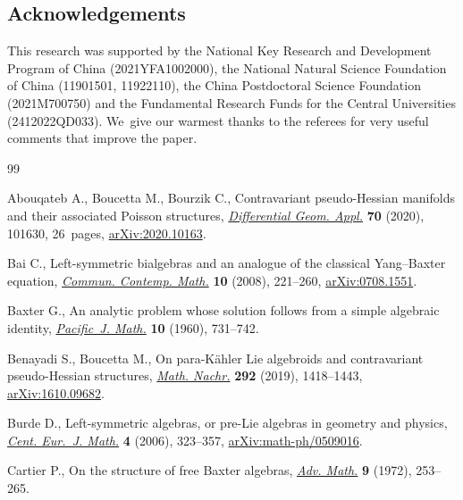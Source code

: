 \documentclass[10pt,a4paper]{amsart}
\numberwithin{equation}{section}
\begin{document}
\subsection*{Acknowledgements}

This research was supported by the National Key Research and Development Program of China (2021YFA1002000), the National Natural Science Foundation of China (11901501, 11922110), the China Postdoctoral Science Foundation (2021M700750) and the Fundamental Research Funds for the Central Universities (2412022QD033). We~give our warmest thanks to the referees for very useful comments that improve the paper.\vspace{-1ex}


\begin{thebibliography}{99}
\footnotesize\itemsep=-0.75pt

Abouqateb A., Boucetta M., Bourzik C., Contravariant pseudo-{H}essian manifolds
 and their associated {P}oisson structures, \href{https://doi.org/10.1016/j.difgeo.2020.101630}{\textit{Differential Geom. Appl.}}
 \textbf{70} (2020), 101630, 26~pages, \href{https://arxiv.org/abs/2020.10163}{arXiv:2020.10163}.

Bai C., Left-symmetric bialgebras and an analogue of the classical
 {Y}ang--{B}axter equation, \href{https://doi.org/10.1142/S0219199708002752}{\textit{Commun. Contemp. Math.}} \textbf{10}
 (2008), 221--260, \href{https://arxiv.org/abs/0708.1551}{arXiv:0708.1551}.

Baxter G., An analytic problem whose solution follows from a simple algebraic
 identity, \href{https://doi.org/10.2140/pjm.1960.10.731}{\textit{Pacific~J. Math.}} \textbf{10} (1960), 731--742.

Benayadi S., Boucetta M., On para-{K}\"{a}hler {L}ie algebroids and
 contravariant pseudo-{H}essian structures, \href{https://doi.org/10.1002/mana.201700137}{\textit{Math. Nachr.}} \textbf{292}
 (2019), 1418--1443, \href{https://arxiv.org/abs/1610.09682}{arXiv:1610.09682}.

Burde D., Left-symmetric algebras, or pre-{L}ie algebras in geometry and
 physics, \href{https://doi.org/10.2478/s11533-006-0014-9}{\textit{Cent. Eur.~J. Math.}} \textbf{4} (2006), 323--357,
 \href{https://arxiv.org/abs/math-ph/0509016}{arXiv:math-ph/0509016}.

Cartier P., On the structure of free {B}axter algebras, \href{https://doi.org/10.1016/0001-8708(72)90018-7}{\textit{Adv. Math.}}
 \textbf{9} (1972), 253--265.


\end{thebibliography}
\end{document}
